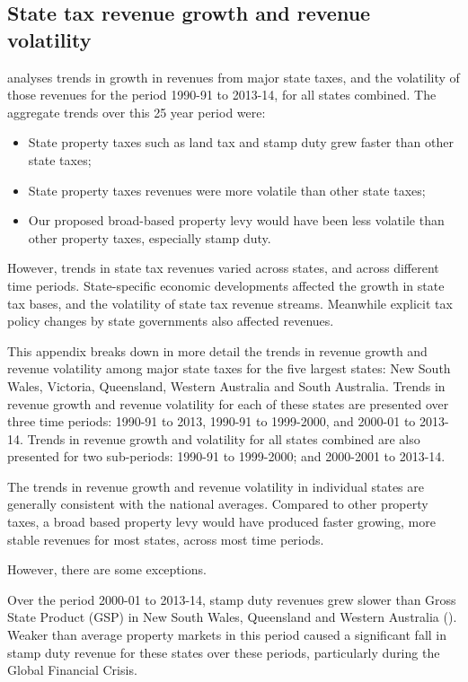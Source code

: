 \documentclass[twoside,english]{palatinob5portrait}
\begin{document}
\begin{subappendices}
\chapter{State tax revenue growth and revenue volatility\label{appendix:PROP}}
 analyses trends in growth in revenues from major state taxes, and the volatility of those revenues for the period 1990-91 to 2013-14, for all states combined. The aggregate trends over this 25 year period were:

\begin{itemize}
\item	State property taxes such as land tax and stamp duty grew faster than other state taxes;
\item	State property taxes revenues were more volatile than other state taxes;
\item	Our proposed broad-based property levy would have been less volatile than other property taxes, especially stamp duty.
\end{itemize}

However, trends in state tax revenues varied across states, and across different time periods. State-specific economic developments affected the growth in state tax bases, and the volatility of state tax revenue streams. Meanwhile explicit tax policy changes by state governments also affected revenues.

This appendix breaks down in more detail the trends in revenue growth and revenue volatility among major state taxes for the five largest states: New South Wales, Victoria, Queensland, Western Australia and South Australia. Trends in revenue growth and revenue volatility for each of these states are presented over three time periods: 1990-91 to 2013, 1990-91 to 1999-2000, and 2000-01 to 2013-14. Trends in revenue growth and volatility for all states combined are also presented for two sub-periods: 1990-91 to 1999-2000; and 2000-2001 to 2013-14.

The trends in revenue growth and revenue volatility in individual states are generally consistent with the national averages. Compared to other property taxes, a broad based property levy would have produced faster growing, more stable revenues for most states, across most time periods.

However, there are some exceptions.  

Over the period 2000-01 to 2013-14, stamp duty revenues grew slower than Gross State Product (GSP) in New South Wales, Queensland and Western Australia (). Weaker than average property markets in this period caused a significant fall in stamp duty revenue for these states over these periods, particularly during the Global Financial Crisis. 


\end{subappendices}
\end{document}
